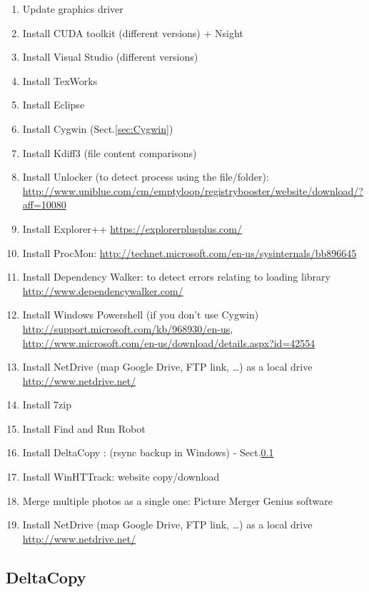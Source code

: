 \begin{enumerate}
  \item Update graphics driver
  \item Install CUDA toolkit (different versions) + Nsight
  \item Install Visual Studio (different versions)
  \item Install TexWorks
  \item Install Eclipse
  \item Install Cygwin (Sect.\ref{sec:Cygwin})
  \item Install Kdiff3 (file content comparisons)
  \item Install Unlocker (to detect process using the file/folder):
  \url{http://www.uniblue.com/cm/emptyloop/registrybooster/website/download/?aff=10080}
  \item Install Explorer++ \url{https://explorerplusplus.com/}
  \item Install ProcMon:
  \url{http://technet.microsoft.com/en-us/sysinternals/bb896645}
  
  
 \item Install Dependency Walker: to
 detect errors relating to loading library
 \url{http://www.dependencywalker.com/}
 
 \item Install Windows Powershell (if you don't use Cygwin)
 \url{http://support.microsoft.com/kb/968930/en-us},
 \url{http://www.microsoft.com/en-us/download/details.aspx?id=42554}
 
 \item Install NetDrive (map Google Drive, FTP link, \ldots) as a local drive
 \url{http://www.netdrive.net/}

\item Install 7zip 
 \item Install Find and Run Robot
 \item Install DeltaCopy : (rsync backup in Windows) - Sect.\ref{sec:DeltaCopy}
 \item Install WinHTTrack: website copy/download
  
 \item Merge multiple photos as a single one: Picture Merger Genius software
 \item Install NetDrive (map Google Drive, FTP link, \ldots) as a local drive
 \url{http://www.netdrive.net/}
\end{enumerate}

\subsection{DeltaCopy}
\label{sec:DeltaCopy}

